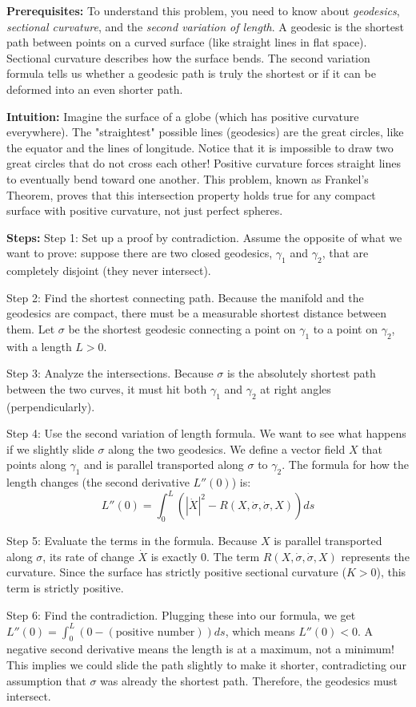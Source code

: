 \begin{solution}
\textbf{Prerequisites:}
To understand this problem, you need to know about \textit{geodesics}, \textit{sectional curvature}, and the \textit{second variation of length}. A geodesic is the shortest path between points on a curved surface (like straight lines in flat space). Sectional curvature describes how the surface bends. The second variation formula tells us whether a geodesic path is truly the shortest or if it can be deformed into an even shorter path.

\vspace{\baselineskip}
\textbf{Intuition:}
Imagine the surface of a globe (which has positive curvature everywhere). The "straightest" possible lines (geodesics) are the great circles, like the equator and the lines of longitude. Notice that it is impossible to draw two great circles that do not cross each other! Positive curvature forces straight lines to eventually bend toward one another. This problem, known as Frankel's Theorem, proves that this intersection property holds true for any compact surface with positive curvature, not just perfect spheres.

\vspace{\baselineskip}
\textbf{Steps:}
Step 1: Set up a proof by contradiction. Assume the opposite of what we want to prove: suppose there are two closed geodesics, $\gamma_1$ and $\gamma_2$, that are completely disjoint (they never intersect).

Step 2: Find the shortest connecting path. Because the manifold and the geodesics are compact, there must be a measurable shortest distance between them. Let $\sigma$ be the shortest geodesic connecting a point on $\gamma_1$ to a point on $\gamma_2$, with a length $L > 0$. 

Step 3: Analyze the intersections. Because $\sigma$ is the absolutely shortest path between the two curves, it must hit both $\gamma_1$ and $\gamma_2$ at right angles (perpendicularly). 

Step 4: Use the second variation of length formula. We want to see what happens if we slightly slide $\sigma$ along the two geodesics. We define a vector field $X$ that points along $\gamma_1$ and is parallel transported along $\sigma$ to $\gamma_2$. The formula for how the length changes (the second derivative $L''(0)$) is:
\[ L''(0) = \int_0^L (|\dot{X}|^2 - R(X, \dot{\sigma}, \dot{\sigma}, X)) ds \]

Step 5: Evaluate the terms in the formula. Because $X$ is parallel transported along $\sigma$, its rate of change $\dot{X}$ is exactly $0$. The term $R(X, \dot{\sigma}, \dot{\sigma}, X)$ represents the curvature. Since the surface has strictly positive sectional curvature ($K > 0$), this term is strictly positive.

Step 6: Find the contradiction. Plugging these into our formula, we get $L''(0) = \int_0^L (0 - (\text{positive number})) ds$, which means $L''(0) < 0$. A negative second derivative means the length is at a maximum, not a minimum! This implies we could slide the path slightly to make it shorter, contradicting our assumption that $\sigma$ was already the shortest path. Therefore, the geodesics must intersect.
\end{solution}

